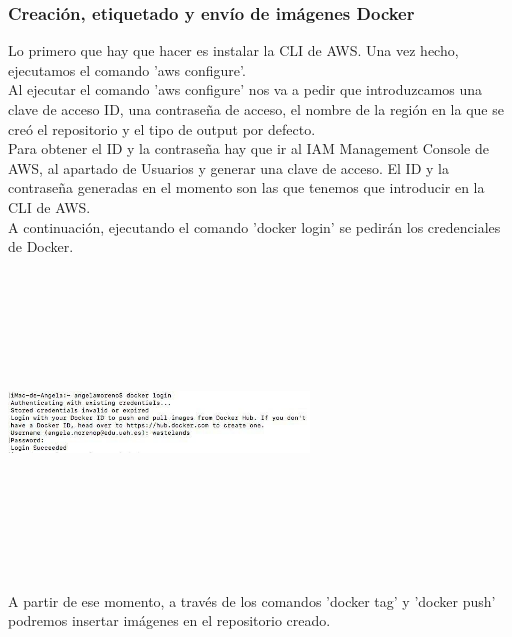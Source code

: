 \documentclass[english,runningheads,a4paper]{llncs}[2018/03/10]
\newenvironment{nscenter}
 {\parskip=0pt\par\nopagebreak\centering}
 {\par\noindent\ignorespacesafterend}
\begin{document}
\subsubsection*{Creación, etiquetado y envío de imágenes Docker}
Lo primero que hay que hacer es instalar la CLI de AWS. Una vez hecho, 
ejecutamos el comando 'aws configure'. \\
Al ejecutar el comando 'aws configure' nos va a pedir que introduzcamos una 
clave de acceso ID, una contraseña de acceso, el nombre de la región en la que 
se creó el repositorio y el tipo de output por defecto. \\
Para obtener el ID y la contraseña hay que ir al IAM Management Console de AWS, 
al apartado de Usuarios y generar una clave de acceso. El ID y la contraseña 
generadas en el momento son las que tenemos que introducir en la CLI de AWS. \\
A continuación, ejecutando el comando 'docker login' se pedirán los credenciales
de Docker. \\
\newline
\begin{nscenter}
\includegraphics[width=8cm,height=8cm,keepaspectratio]{./Contenedores/AWS/17.jpg}
\end{nscenter}
\newline
A partir de ese momento, a través de los comandos 'docker tag' y 'docker push' 
podremos insertar imágenes en el repositorio creado.

\newpage
\end{document}
